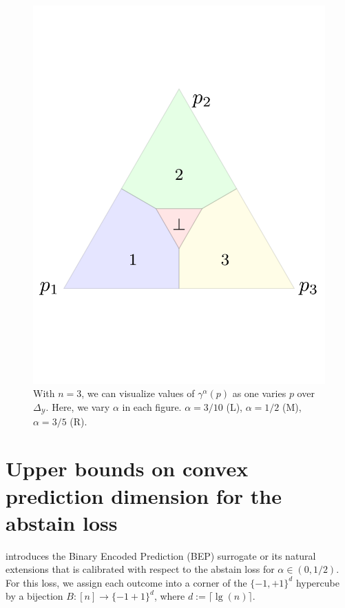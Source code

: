 \documentclass[anon,12pt]{colt2021} %
\newcommand{\simplex}{\Delta_\Y}
\newcommand{\Y}{\mathcal{Y}}
\begin{document}
\begin{figure}
\begin{minipage}{.32\textwidth}
	\includegraphics[width=\linewidth]{figs/abstain-alpha-point6.pdf}
\end{minipage}%
\caption{With $n = 3$, we can visualize values of $\gamma^\alpha(p)$ as one varies $p$ over $\simplex$.   Here, we vary $\alpha$ in each figure. $\alpha = 3/10$ (L), $\alpha = 1/2$ (M), $\alpha = 3/5$ (R).}
\end{figure}

\section{Upper bounds on convex prediction dimension for the abstain loss}

\cite{ramaswamy2018consistent} introduces the Binary Encoded Prediction (BEP) surrogate or its natural extensions that is calibrated with respect to the abstain loss for $\alpha \in (0,1/2)$.
For this loss, we assign each outcome into a corner of the $\{-1, +1\}^d$ hypercube by a bijection $B : [n] \to \{-1+1\}^d$, where $d := \lceil \lg(n) \rceil$.
\end{document}
